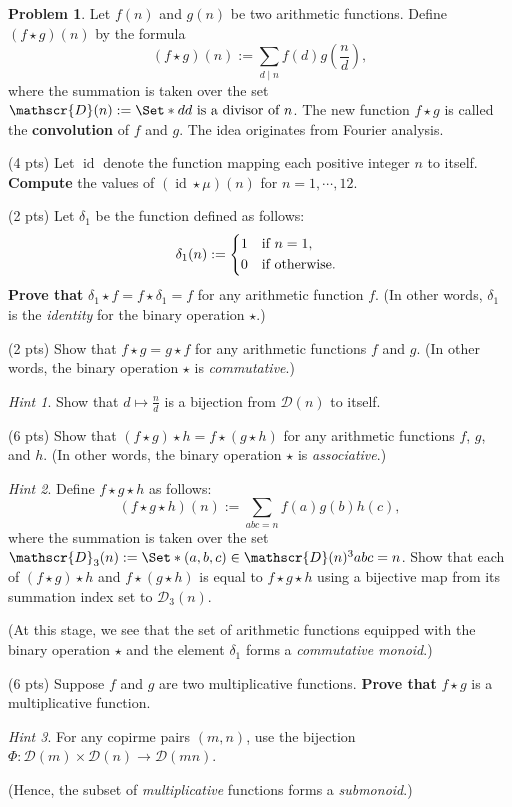 \documentclass[11pt]{article}
\theoremstyle{plain}
\theoremstyle{definition}
\newtheorem{problem}{Problem}
\theoremstyle{remark}
\newtheorem*{hint}{Hint}
\numberwithin{equation}{problem}
\DeclareMathOperator{\id}{id} %
\providecommand\given{}
\begin{document}
\begin{problem}
	Let $f(n)$ and $g(n)$ be two arithmetic functions. Define $(f \star g)(n)$ by the formula 
	\[
		(f \star g)(n) := \sum_{d\mid n} f(d)g(\frac{n}{d}),
	\]
	where the summation is taken over the set $\mathscr{D}(n):=\Set*{ d \given d \text{ is a divisor of } n }$. 
	The new function $f \star g$ is called the \textbf{convolution} of $f$ and $g$. The idea originates from Fourier analysis.
	\begin{listinprob}[resume]
		\item (4 pts) Let $\id$ denote the function mapping each positive integer $n$ to itself. \textbf{Compute} the values of $(\id \star \mu)(n)$ for $n=1,\cdots,12$.
		\item (2 pts) Let $\delta_{1}$ be the function defined as follows:
		\[
			\delta_{1}(n) := 
			\begin{dcases*}
				1 & if $n=1$,\\
				0 & if otherwise.
			\end{dcases*}
		\]
		\textbf{Prove that} $\delta_{1}\star f = f\star\delta_{1} = f$ for any arithmetic function $f$.
		(In other words, $\delta_{1}$ is the \emph{identity} for the binary operation $\star$.)
		\item (2 pts) Show that $f\star g = g\star f$ for any arithmetic functions $f$ and $g$. (In other words, the binary operation $\star$ is \emph{commutative}.)
		\begin{hint}
			Show that $d\mapsto \frac{n}{d}$ is a bijection from $\mathscr{D}(n)$ to itself.
		\end{hint}
		\item (6 pts) Show that $(f\star g)\star h = f\star (g\star h)$ for any arithmetic functions $f$, $g$, and $h$. (In other words, the binary operation $\star$ is \emph{associative}.)
		\begin{hint}
			Define $f\star g\star h$ as follows:
			\[
				(f\star g\star h)(n):=\sum_{abc=n}f(a)g(b)h(c),
			\]
			where the summation is taken over the set $\mathscr{D}_{3}(n):=\Set*{ (a,b,c)\in\mathscr{D}(n)^3 \given abc=n }$. 
			Show that each of $(f\star g)\star h$ and $f\star (g\star h)$ is equal to $f\star g\star h$ using a bijective map from its summation index set to $\mathscr{D}_{3}(n)$. 
		\end{hint}
		(At this stage, we see that the set of arithmetic functions equipped with the binary operation $\star$ and the element $\delta_{1}$ forms a \emph{commutative monoid}.)
		\item (6 pts) Suppose $f$ and $g$ are two multiplicative functions. \textbf{Prove that} $f \star g$ is a multiplicative function.
		\begin{hint}
			For any copirme pairs $(m,n)$, use the bijection 
			$\Phi\colon \mathscr{D}(m)\times\mathscr{D}(n) \rightarrow \mathscr{D}(mn)$.
		\end{hint}
		(Hence, the subset of \emph{multiplicative} functions forms a \emph{submonoid}.)
	\end{listinprob}
\end{problem}
\end{document}
